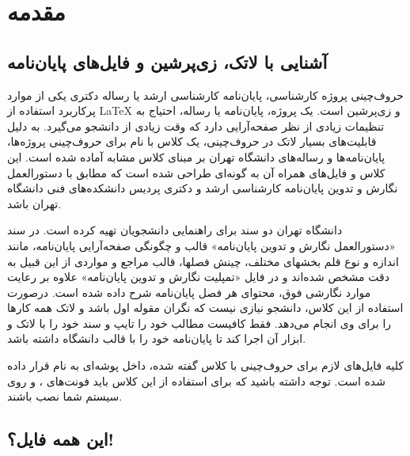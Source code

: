 
\chapter{مقدمه}
\thispagestyle{empty}
\section{آشنایی با لاتک، زی‌پرشین و فایل‌های پایان‌نامه}
حروف‌چینی پروژه کارشناسی، پایان‌نامه کارشناسی ارشد یا رساله دکتری یکی از موارد پرکاربرد استفاده از
\LaTeX
و زی‌پرشین
\cite{Khalighi87xepersian}
است. یک پروژه، پایان‌نامه یا رساله، احتیاج به تنظیمات زیادی از نظر صفحه‌آرایی دارد که وقت زیادی از دانشجو می‌گیرد. به دلیل قابلیت‌های بسیار لاتک در حروف‌چینی، یک کلاس با نام 
برای حروف‌چینی پروژه‌ها، پایان‌نامه‌ها و رساله‌های دانشگاه تهران بر مبنای کلاس مشابه
آماده شده است. این کلاس و فایل‌های همراه آن به گونه‌ای طراحی شده است که مطابق با دستورالعمل نگارش و تدوین پایان‌نامه کارشناسی ارشد و دکتری پردیس دانشکده‌های فنی دانشگاه تهران
\cite{UTThesisGuide}
باشد.

دانشگاه تهران دو سند برای راهنمایی دانشجویان تهیه کرده است. در سند «دستورالعمل نگارش و تدوین پایان‌نامه» قالب و چگونگی صفحه‌آرایی پایان‌نامه، مانند اندازه و نوع قلم بخشهای مختلف، چینش فصلها، قالب مراجع و مواردی از این قبیل به دقت مشخص شده‌اند و در فایل «تمپلیت نگارش و تدوین پایان‌نامه» علاوه بر رعایت موارد نگارشی فوق، محتوای هر فصل پایان‌نامه شرح داده شده است. 
درصورت استفاده از این کلاس، دانشجو نیازی نیست که نگران مقوله اول باشد و لاتک همه کارها را برای وی انجام می‌دهد. فقط کافیست مطالب خود را تایپ و سند خود را با لاتک و ابزار آن اجرا کند تا پایان‌نامه خود را با قالب دانشگاه داشته باشد.

کلیه فایل‌های لازم برای حروف‌چینی با کلاس گفته شده، داخل پوشه‌ای به نام
قرار داده شده است. توجه داشته باشید که برای استفاده از این کلاس باید فونت‌های
،
و
روی سیستم شما نصب باشند.
\section{این همه فایل؟!}\label{sec2}

